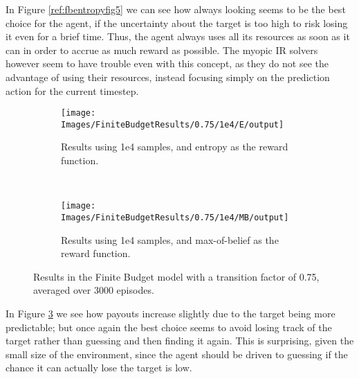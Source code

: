 In Figure \ref{ref:fbentropyfig5} we can see how always looking seems to be the best choice for the
agent, if the uncertainty about the target is too high to risk losing it even for a brief time.
Thus, the agent always uses all its resources as soon as it can in order to accrue as much reward as
possible. The myopic IR solvers however seem to have trouble even with this concept, as they do not
see the advantage of using their resources, instead focusing simply on the prediction action for the
current timestep.


\begin{figure}[ht!]
        \centering
        \begin{subfigure}[t]{0.45\textwidth}
                \texttt{[image: Images/FiniteBudgetResults/0.75/1e4/E/output]}
                \caption{Results using 1e4 samples, and entropy as the reward function.}
                \label{fig:fb4e75}
        \end{subfigure}%
        ~ %
        \begin{subfigure}[t]{0.45\textwidth}
                \texttt{[image: Images/FiniteBudgetResults/0.75/1e4/MB/output]}
                \caption{Results using 1e4 samples, and max-of-belief as the reward function.}
                \label{fig:fb5e75}
        \end{subfigure}
        \caption{Results in the Finite Budget model with a transition factor of 0.75, averaged over 3000 episodes.}
        \label{ref:fbentropyfig75}
\end{figure}


In Figure \ref{ref:fbentropyfig75} we see how payouts increase slightly due to the target being more
predictable; but once again the best choice seems to avoid losing track of the target rather than
guessing and then finding it again. This is surprising, given the small size of the environment,
since the agent should be driven to guessing if the chance it can actually lose the target is low.

